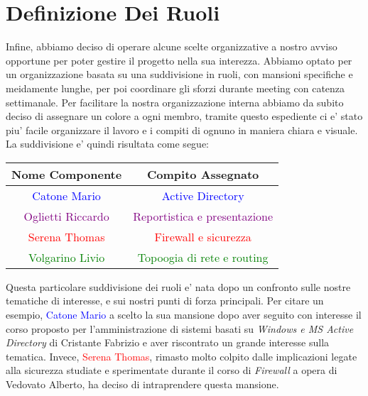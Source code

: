 \documentclass{report}
\begin{document}
        \section{Definizione Dei Ruoli}
            Infine, abbiamo deciso di operare alcune scelte organizzative a nostro avviso opportune per poter gestire il
             progetto nella sua interezza. Abbiamo optato per un organizzazione basata su una suddivisione in ruoli, con
             mansioni specifiche e meidamente lunghe, per poi coordinare gli sforzi durante meeting con catenza settimanale.
            Per facilitare la nostra organizzazione interna abbiamo da subito deciso di assegnare un colore a ogni membro,
             tramite questo espediente ci e' stato piu' facile organizzare il lavoro e i compiti di ognuno in maniera chiara
             e visuale. 
            La suddivisione e' quindi risultata come segue: 
            \begin{center}
                \begin{tabular}{ |c|c| }
                    \hline
                    Nome Componente & Compito Assegnato \\
                    \hline \hline
                    \textcolor{Blue}{Catone Mario} & \textcolor{Blue}{Active Directory} \\
                    \hline
                    \textcolor{Purple}{Oglietti Riccardo} & \textcolor{Purple}{Reportistica e presentazione} \\
                    \hline
                    \textcolor{Red}{Serena Thomas} & \textcolor{Red}{Firewall e sicurezza} \\
                    \hline
                    \textcolor{Green}{Volgarino Livio} & \textcolor{Green}{Topoogia di rete e routing} \\
                    \hline
                \end{tabular}
            \end{center}
            Questa particolare suddivisione dei ruoli e' nata dopo un confronto sulle nostre tematiche di interesse, e sui
             nostri punti di forza principali. Per citare un esempio, \textcolor{Blue}{Catone Mario} a scelto la sua mansione
             dopo aver seguito con interesse il corso proposto per l'amministrazione di sistemi basati su \emph{Windows e MS
             Active Directory} di Cristante Fabrizio e aver riscontrato un grande interesse sulla tematica. Invece,
             \textcolor{Red}{Serena Thomas}, rimasto molto colpito dalle implicazioni legate alla sicurezza studiate e
             sperimentate durante il corso di \emph{Firewall} a opera di Vedovato Alberto, ha deciso di intraprendere
             questa mansione.
\end{document}
